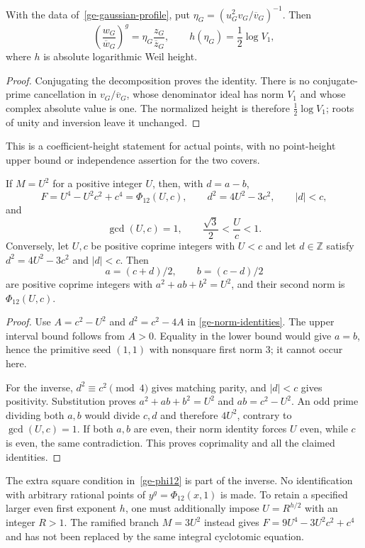 \begin{corollary}
\label{ge-coefficient-height}
With the data of~\eqref{ge-gaussian-profile}, put
$\eta_G=(u_G^2v_G/\overline v_G)^{-1}$. Then
\[
 \left(\frac{w_G}{\overline w_G}\right)^g
   =\eta_G\frac{z_G}{\overline z_G},
 \qquad h(\eta_G)=\frac12\log V_1,
\]
where $h$ is absolute logarithmic Weil height.
\end{corollary}
\begin{proof}
Conjugating the decomposition proves the identity. There is no
conjugate-prime cancellation in $v_G/\overline v_G$, whose denominator
ideal has norm $V_1$ and whose complex absolute value is one.
The normalized height is therefore $\frac12\log V_1$; roots of unity
and inversion leave it unchanged.
\end{proof}
This is a coefficient-height statement for actual points, with no
point-height upper bound or independence assertion for the two covers.

\begin{theorem}
\label{ge-cyclotomic-inverse}
If $M=U^2$ for a positive integer $U$, then, with $d=a-b$,
\begin{equation}\label{ge-phi12}
 F=U^4-U^2c^2+c^4=\Phi_{12}(U,c),\qquad
 d^2=4U^2-3c^2,\qquad |d|<c,
\end{equation}
and
\[
 \gcd(U,c)=1,\qquad \frac{\sqrt3}{2}<\frac Uc<1.
\]
Conversely, let $U,c$ be positive coprime integers with $U<c$ and let
$d\in\mathbb Z$ satisfy $d^2=4U^2-3c^2$ and $|d|<c$. Then
\begin{equation}\label{ge-inverse-seed}
 a=(c+d)/2,\qquad b=(c-d)/2
\end{equation}
are positive coprime integers with $a^2+ab+b^2=U^2$, and their second
norm is $\Phi_{12}(U,c)$.
\end{theorem}
\begin{proof}
Use $A=c^2-U^2$ and $d^2=c^2-4A$ in
\eqref{ge-norm-identities}. The upper interval bound follows from $A>0$.
Equality in the lower bound would give $a=b$, hence the primitive seed
$(1,1)$ with nonsquare first norm $3$; it cannot occur here.

For the inverse, $d^2\equiv c^2\pmod4$ gives matching parity, and
$|d|<c$ gives positivity. Substitution proves $a^2+ab+b^2=U^2$ and
$ab=c^2-U^2$. An odd prime dividing both $a,b$ would divide $c,d$ and
therefore $4U^2$, contrary to $\gcd(U,c)=1$. If both $a,b$ are even,
their norm identity forces $U$ even, while $c$ is even, the same
contradiction. This proves coprimality and all the claimed identities.
\end{proof}
The extra square condition in~\eqref{ge-phi12} is part of the inverse.
No identification with arbitrary rational points of
$y^g=\Phi_{12}(x,1)$ is made. To retain a specified larger even first
exponent $h$, one must additionally impose $U=R^{h/2}$ with an integer
$R>1$. The ramified branch $M=3U^2$ instead gives
$F=9U^4-3U^2c^2+c^4$ and has not been replaced by the same integral
cyclotomic equation.

